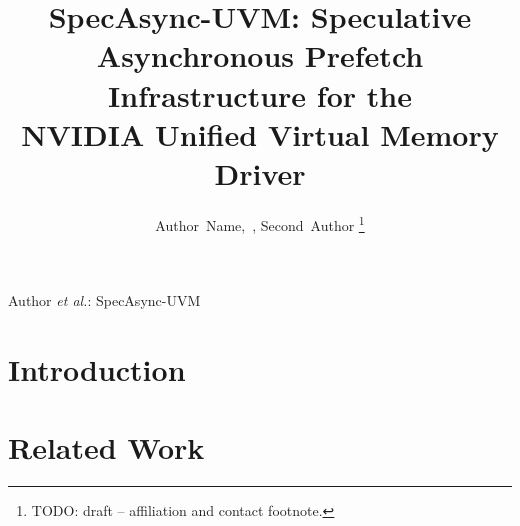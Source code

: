 \documentclass[journal]{IEEEtran}
\begin{document}
\title{SpecAsync-UVM: Speculative Asynchronous Prefetch Infrastructure for the\\
NVIDIA Unified Virtual Memory Driver}

\author{%
  Author~Name,~,
  Second~Author%
  \thanks{TODO: draft -- affiliation and contact footnote.}%
}


%
{Author \MakeLowercase{\textit{et al.}}: SpecAsync-UVM}

\maketitle

\begin{abstract}
\end{abstract}

\begin{IEEEkeywords}
\end{IEEEkeywords}

\section{Introduction}
\label{sec:introduction}

\section{Related Work}
\label{sec:related-work}
\end{document}
